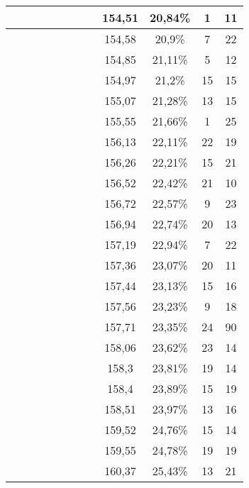 \begin{center}
\begin{longtable}{|c|c|c|c|c|c|c|c|c|c|c|c|}
 \x &  \x &  \x &  &  \x &  &  \x &  \x & 154,51 & 20,84\% & 1 & 11  \\ \hline
 \x &  &  &  &  \x &  &  \x &  & 154,58 & 20,9\% & 7 & 22  \\ \hline
 \x &  \x &  &  &  &  \x &  \x &  & 154,85 & 21,11\% & 5 & 12  \\ \hline
 \x &  \x &  &  \x &  &  &  \x &  & 154,97 & 21,2\% & 15 & 15  \\ \hline
 \x &  \x &  &  \x &  \x &  &  \x &  \x & 155,07 & 21,28\% & 13 & 15  \\ \hline
 \x &  \x &  &  \x &  &  &  \x &  \x & 155,55 & 21,66\% & 1 & 25  \\ \hline
 \x &  &  &  &  \x &  &  \x &  \x & 156,13 & 22,11\% & 22 & 19  \\ \hline
 \x &  \x &  \x &  \x &  \x &  &  &  & 156,26 & 22,21\% & 15 & 21  \\ \hline
 \x &  &  \x &  \x &  &  &  \x &  \x & 156,52 & 22,42\% & 21 & 10  \\ \hline
 \x &  &  \x &  \x &  \x &  &  \x &  & 156,72 & 22,57\% & 9 & 23  \\ \hline
 \x &  \x &  &  \x &  \x &  &  &  & 156,94 & 22,74\% & 20 & 13  \\ \hline
 \x &  &  \x &  &  &  \x &  \x &  & 157,19 & 22,94\% & 7 & 22  \\ \hline
 \x &  &  &  &  &  &  \x &  \x & 157,36 & 23,07\% & 20 & 11  \\ \hline
 \x &  &  \x &  \x &  \x &  &  &  \x & 157,44 & 23,13\% & 15 & 16  \\ \hline
 \x &  \x &  &  &  \x &  &  \x &  \x & 157,56 & 23,23\% & 9 & 18  \\ \hline
 \x &  \x &  \x &  &  &  &  \x &  & 157,71 & 23,35\% & 24 & 90  \\ \hline
 \x &  &  &  \x &  \x &  &  \x &  & 158,06 & 23,62\% & 23 & 14  \\ \hline
 \x &  \x &  &  \x &  &  &  &  & 158,3 & 23,81\% & 19 & 14  \\ \hline
 \x &  &  &  \x &  &  &  \x &  \x & 158,4 & 23,89\% & 15 & 19  \\ \hline
 \x &  &  &  &  &  \x &  \x &  & 158,51 & 23,97\% & 13 & 16  \\ \hline
 \x &  \x &  \x &  \x &  \x &  &  \x &  \x & 159,52 & 24,76\% & 15 & 14  \\ \hline
 \x &  &  \x &  \x &  &  &  \x &  & 159,55 & 24,78\% & 19 & 19  \\ \hline
 \x &  &  \x &  \x &  \x &  &  \x &  \x & 160,37 & 25,43\% & 13 & 21  \\ \hline

\end{longtable}
\end{center}
